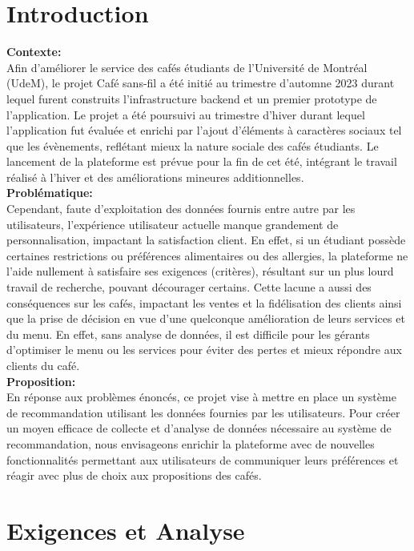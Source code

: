 \documentclass[11pt]{article}
\begin{document}
\section{Introduction}
\textbf{Contexte:}\\
Afin d'améliorer le service des cafés étudiants de l'Université de Montréal (UdeM), le projet Café sans-fil a été initié au trimestre d'automne 2023 durant lequel furent construits l'infrastructure backend et un premier prototype de l'application. Le projet a été poursuivi au trimestre d'hiver durant lequel l'application fut évaluée et enrichi par l'ajout d'éléments à caractères sociaux tel que les évènements, reflétant mieux la nature sociale des cafés étudiants. Le lancement de la plateforme est prévue pour la fin de cet été, intégrant le travail réalisé à l'hiver et des améliorations mineures additionnelles.\\

\textbf{Problématique:}\\
Cependant, faute d'exploitation des données fournis entre autre par les utilisateurs, l'expérience utilisateur actuelle manque grandement de personnalisation, impactant la satisfaction client. En effet, si un étudiant possède certaines restrictions ou préférences alimentaires ou des allergies, la plateforme ne l'aide nullement à satisfaire ses exigences (critères), résultant sur un plus lourd travail de recherche, pouvant décourager certains.
Cette lacune a aussi des conséquences sur les cafés, impactant les ventes et la fidélisation des clients ainsi que la prise de décision en vue d'une quelconque amélioration de leurs services et du menu. En effet, sans analyse de données, il est difficile pour les gérants d'optimiser le menu ou les services pour éviter des pertes et mieux répondre aux clients du café.\\

\textbf{Proposition:}\\
En réponse aux problèmes énoncés, ce projet vise à mettre en place un système de recommandation utilisant les données fournies par les utilisateurs. Pour créer un moyen efficace de collecte et d'analyse de données nécessaire au système de recommandation, nous envisageons enrichir la plateforme avec de nouvelles fonctionnalités permettant aux utilisateurs de communiquer leurs préférences et réagir avec plus de choix aux propositions des cafés.

\newpage
\section{Exigences et Analyse}
\end{document}
